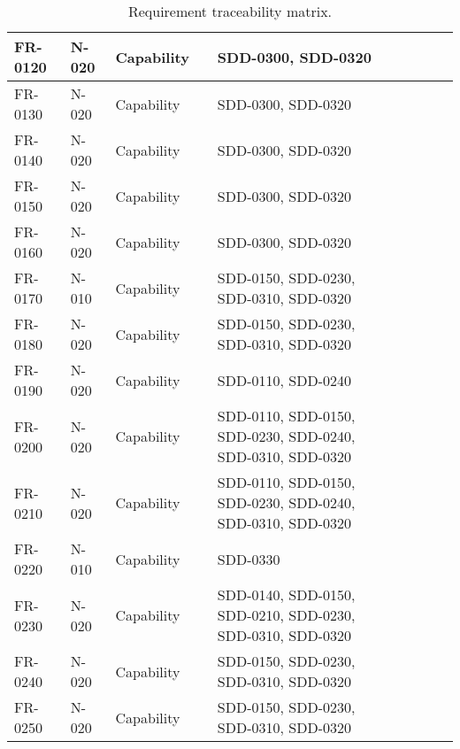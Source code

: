 \begin{sidewaystable}
\begin{table}[H]
\begin{tabular}{|p{2cm}|p{2cm}|p{3cm}|p{2cm}|p{2cm}|p{2cm}|p{2cm}|p{2cm}|p{2cm}|}
 FR-0120 & N-020 & Capability & &SDD-0300, SDD-0320 & & & &\\ \hline
 FR-0130 & N-020 & Capability & &SDD-0300, SDD-0320 & & & &\\ \hline
 FR-0140 & N-020 & Capability & &SDD-0300, SDD-0320 & & & &\\ \hline
 FR-0150 & N-020 & Capability & &SDD-0300, SDD-0320& & & &\\ \hline
 FR-0160 & N-020 & Capability & &SDD-0300, SDD-0320 & & & &\\ \hline
 FR-0170 & N-010 & Capability & &SDD-0150, SDD-0230, SDD-0310, SDD-0320 & & & &\\ \hline
 FR-0180 & N-020 & Capability & &SDD-0150, SDD-0230, SDD-0310, SDD-0320  & & & &\\ \hline
 FR-0190 & N-020 & Capability & &SDD-0110, SDD-0240 & & & &\\ \hline
 FR-0200 & N-020 & Capability & &SDD-0110,  SDD-0150, SDD-0230, SDD-0240, SDD-0310, SDD-0320& & & &\\ \hline
 FR-0210 & N-020 & Capability & &SDD-0110,  SDD-0150, SDD-0230, SDD-0240, SDD-0310, SDD-0320& & & &\\ \hline
 FR-0220 & N-010 & Capability & &SDD-0330 & & & &\\ \hline
 FR-0230 & N-020 & Capability & &SDD-0140, SDD-0150, SDD-0210, SDD-0230, SDD-0310, SDD-0320& & & &\\ \hline
 FR-0240 & N-020 & Capability & &SDD-0150, SDD-0230, SDD-0310, SDD-0320& & & &\\ \hline
 FR-0250 & N-020 & Capability & &SDD-0150, SDD-0230, SDD-0310, SDD-0320 & & & &\\ \hline
 
\end{tabular}	
\caption{Requirement traceability matrix.}
\end{table}

\end{sidewaystable}




